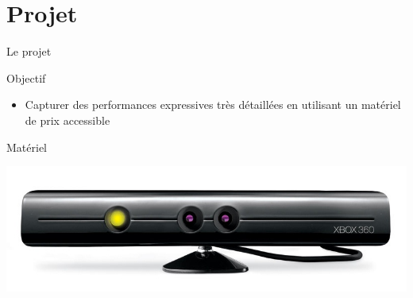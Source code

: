 \documentclass[compress,pdf,11pt,xcolor=dvipsnames]{beamer}
\begin{document}
\section{Projet}
\begin{frame}{Le projet}
  \begin{block}{Objectif}
    \begin{itemize}
    \item Capturer des performances expressives très
      détaillées en utilisant un matériel de prix accessible
    \end{itemize}
  \end{block}

  \begin{bkblock}{Matériel}
    \begin{centering}
      \includegraphics[scale=0.2]{img/kinect}
    \end{centering}
  \end{bkblock}


\end{frame}
\end{document}

